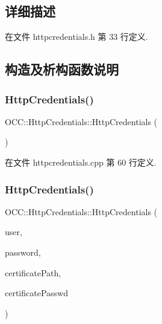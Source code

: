 \subsection{详细描述}


在文件 httpcredentials.\+h 第 33 行定义.



\subsection{构造及析构函数说明}
\mbox{\label{class_o_c_c_1_1_http_credentials_a4d750c065169740b078f4483cd0211fb}} 
\subsubsection{\texorpdfstring{Http\+Credentials()}{HttpCredentials()}\hspace{0.1cm}{\footnotesize\ttfamily [1/2]}}
{\footnotesize\ttfamily O\+C\+C\+::\+Http\+Credentials\+::\+Http\+Credentials (\begin{DoxyParamCaption}{ }\end{DoxyParamCaption})\hspace{0.3cm}{\ttfamily [explicit]}}



在文件 httpcredentials.\+cpp 第 60 行定义.

\mbox{\label{class_o_c_c_1_1_http_credentials_a2c6e2c5df342e600fde5b7c228b74bd4}} 
\subsubsection{\texorpdfstring{Http\+Credentials()}{HttpCredentials()}\hspace{0.1cm}{\footnotesize\ttfamily [2/2]}}
{\footnotesize\ttfamily O\+C\+C\+::\+Http\+Credentials\+::\+Http\+Credentials (\begin{DoxyParamCaption}\item[{const Q\+String \&}]{user,  }\item[{const Q\+String \&}]{password,  }\item[{const Q\+String \&}]{certificate\+Path,  }\item[{const Q\+String \&}]{certificate\+Passwd }\end{DoxyParamCaption})}



